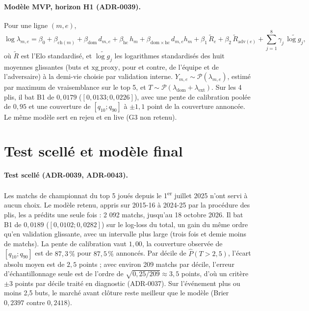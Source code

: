 \paragraph{Modèle MVP, horizon H1 (ADR-0039).} Pour une ligne \((m, e)\),
\[
  \log \lambda_{m,e} = \beta_0 + \beta_{\mathrm{ch}(m)} + \beta_{\mathrm{dom}}\, d_{m,e}
  + \beta_{\mathrm{hc}}\, h_m + \beta_{\mathrm{dom \times hc}}\, d_{m,e} h_m
  + \beta_{1}\, \tilde R_e + \beta_{2}\, \tilde R_{\mathrm{adv}(e)}
  + \sum_{j=1}^{8} \gamma_j\, \widetilde{\log g_j},
\]
où \(\tilde R\) est l'Elo standardisé, et \(\widetilde{\log g_j}\) les logarithmes standardisés des huit
moyennes glissantes (buts et \(\mathrm{xg\_proxy}\), pour et contre, de l'équipe et de l'adversaire) à
la demi-vie choisie par validation interne. \(Y_{m,e} \sim \mathcal{P}(\lambda_{m,e})\), estimé par
maximum de vraisemblance sur le top 5, et \(T \sim \mathcal{P}(\lambda_{\mathrm{dom}} +
\lambda_{\mathrm{ext}})\). Sur les 4 plis, il bat B1 de \(0{,}0179\) (\([0{,}0133 ; 0{,}0226]\)), avec une
pente de calibration poolée de \(0{,}95\) et une couverture de \([q_{10} ; q_{90}]\) à \(\pm 1{,}1\) point
de la couverture annoncée. Le même modèle sert en rejeu et en live (G3 non retenu).

\section{Test scellé et modèle final}
\label{sec:test-scelle}

\paragraph{Test scellé (ADR-0039, ADR-0043).} Les matchs de championnat du top 5 joués depuis le
1\textsuperscript{er} juillet 2025 n'ont servi à aucun choix. Le modèle retenu, appris sur 2015-16 à
2024-25 par la procédure des plis, les a prédits une seule fois : 2 092 matchs, jusqu'au 18 octobre
2026. Il bat B1 de \(0{,}0189\) (\([0{,}0102 ; 0{,}0282]\)) sur le log-loss du total, un gain du même
ordre qu'en validation glissante, avec un intervalle plus large (trois fois et demie moins de matchs).
La pente de calibration vaut \(1{,}00\), la couverture observée de \([q_{10} ; q_{90}]\) est de
\(87{,}3\,\%\) pour \(87{,}5\,\%\) annoncés. Par décile de \(\hat P(T > 2{,}5)\), l'écart absolu moyen
est de \(2{,}5\) points ; avec environ 209 matchs par décile, l'erreur d'échantillonnage seule est de
l'ordre de \(\sqrt{0{,}25 / 209} \approx 3{,}5\) points, d'où un critère \og \(\pm 3\) points par décile
\fg{} traité en diagnostic (ADR-0037). Sur l'événement plus ou moins 2,5 buts, le marché avant clôture
reste meilleur que le modèle (Brier \(0{,}2397\) contre \(0{,}2418\)).

